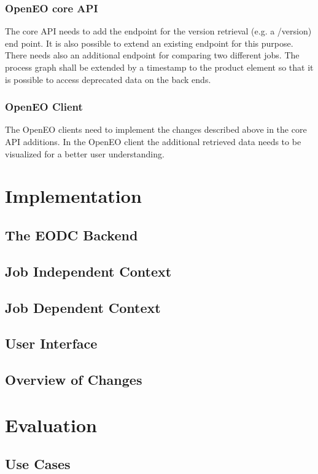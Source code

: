 \documentclass[draft,final]{vutinfth} %
\begin{document}
\subsection{OpenEO core API}
The core API needs to add the endpoint for the version retrieval (e.g. a /version) end point. It is also possible to extend an existing endpoint for this purpose. 
There needs also an additional endpoint for comparing two different jobs. 
The process graph shall be extended by a timestamp to the product element so that it is possible to access deprecated data on the back ends.
\subsection{OpenEO Client}
The OpenEO clients need to implement the changes described above in the core API additions. In the OpenEO client the additional retrieved data needs to be visualized for a better user understanding.


\chapter{Implementation}
\section{The EODC Backend}
\section{Job Independent Context}
\section{Job Dependent Context}
\section{User Interface}
\section{Overview of Changes}


\chapter{Evaluation}
\section{Use Cases}
\end{document}
